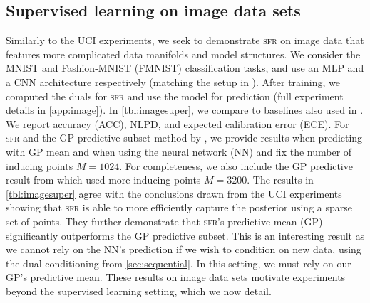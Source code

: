 \documentclass{article} %
\newcommand{\our}{\textsc{sfr}\xspace}
\begin{document}
\subsection{Supervised learning on image data sets}
\label{sec:image}
Similarly to the UCI experiments, we seek to demonstrate \our on image data that features more complicated data manifolds and model structures.
We consider the MNIST and Fashion-MNIST (FMNIST) classification tasks, and use an MLP and a CNN architecture respectively (matching the setup in \cite{immer2021improving}).
After training, we computed the duals for \our and use the model for prediction (full experiment details in \cref{app:image}).
In \cref{tbl:imagesuper}, we compare to baselines also used in \cite{immer2021improving}.
We report accuracy (ACC), NLPD, and expected calibration error (ECE).
For \our and the GP predictive subset method by \cite{immer2021improving}, we provide results when predicting with GP mean and when using the neural network (NN) and
fix the number of inducing points $M=1024$.
For completeness, we also include the GP predictive result from \cite{immer2021improving} which used more inducing points $M=3200$.
The results in \cref{tbl:imagesuper} agree with the conclusions drawn from the UCI experiments showing that \our is able to more efficiently capture the posterior using a sparse set of points.
They further demonstrate that \our's predictive mean (GP) significantly outperforms the GP predictive subset.
This is an interesting result as we cannot rely on the NN's prediction if we wish to condition on new data, using the dual conditioning from \cref{sec:sequential}.
In this setting, we must rely on our GP's predictive mean.
These results on image data sets motivate experiments beyond the supervised learning setting, which we now detail.





\end{document}
